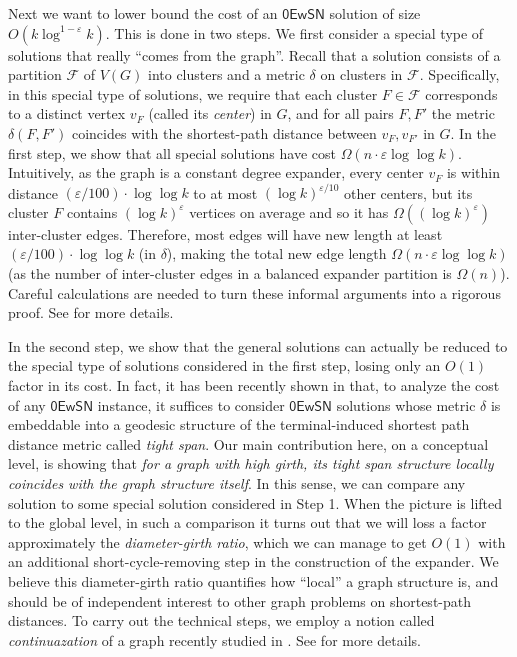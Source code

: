 \documentclass[11pt]{article}
\theoremstyle{definition}
\newcommand{\fset}{{\mathcal{F}}}
\newcommand{\eps}{{\varepsilon}}
\newcommand{\zesn}{\mathsf{0EwSN}}
\begin{document}
Next we want to lower bound the cost of an $\zesn$ solution of size $O(k\log^{1-\eps} k)$. This is done in two steps. We first consider a special type of solutions that really ``comes from the graph''. Recall that a solution consists of a partition $\fset$ of $V(G)$ into clusters and a metric $\delta$ on clusters in $\fset$. Specifically, in this special type of solutions, we require that each cluster $F\in \fset$ corresponds to a distinct vertex $v_F$ (called its \emph{center}) in $G$, and for all pairs $F,F'$ the metric $\delta(F,F')$ coincides with the shortest-path distance between $v_F, v_{F'}$ in $G$.
In the first step, we show that all special solutions have cost $\Omega(n\cdot \eps \log\log k)$. Intuitively, as the graph is a constant degree expander, every center $v_F$ is within distance $(\eps/100)\cdot \log\log k$ to at most $(\log k)^{\eps/10}$ other centers, but its cluster $F$ contains $(\log k)^{\eps}$ vertices on average and so it has $\Omega((\log k)^{\eps})$ inter-cluster edges. Therefore, most edges will have new length at least $(\eps/100)\cdot \log\log k$ (in $\delta$), making the total new edge length $\Omega(n \cdot \eps \log\log k)$ (as the number of inter-cluster edges in a balanced expander partition is $\Omega(n)$). Careful calculations are needed to turn these informal arguments into a rigorous proof. See  for more details.

In the second step, we show that the general solutions can actually be reduced to the special type of solutions considered in the first step, losing only an $O(1)$ factor in its cost. In fact, it has been recently shown in \cite{chen20241+} that, to analyze the cost of any $\zesn$ instance, it suffices to consider $\zesn$ solutions whose metric $\delta$ is embeddable into a geodesic structure of the terminal-induced shortest path distance metric called \emph{tight span}. Our main contribution here, on a conceptual level, is showing that \emph{for a graph with high girth, its tight span structure locally coincides with the graph structure itself}. In this sense, we can compare any solution to some special solution considered in Step 1. When the picture is lifted to the global level, in such a comparison it turns out that we will loss a factor approximately the \emph{diameter-girth ratio}, which we can manage to get $O(1)$ with an additional short-cycle-removing step in the construction of the expander. We believe this diameter-girth ratio quantifies how ``local'' a graph structure is, and should be of independent interest to other graph problems on shortest-path distances.
To carry out the technical steps, we employ a notion called \emph{continuazation} of a graph recently studied in \cite{chen2023towards}.
See  for more details.
\end{document}
